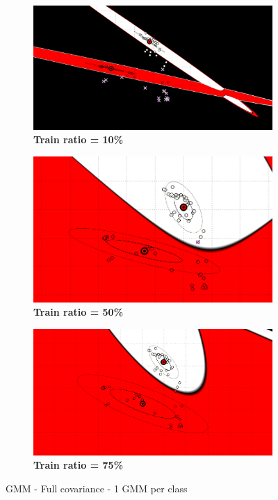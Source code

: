 \begin{figure} [ht]
\centering
	\begin{subfigure}[h]{0.32\textwidth}
    \centering
	\includegraphics[height=0.11\textheight]{./classification/full_var_gmm_1_10pourcent_test.png}
	\caption{\bf Train ratio = 10\%}
	\end{subfigure}
    \begin{subfigure}[h]{0.32\textwidth}
    \centering
    \includegraphics[height=0.11\textheight]{./classification/full_var_gmm_1_50pourcent_test.png}
	\caption{\bf Train ratio = 50\%}
    \end{subfigure}
    \begin{subfigure}[h]{0.32\textwidth}
    \centering
    \includegraphics[height=0.11\textheight]{./classification/full_var_gmm_1_75pourcent_test.png}
	\caption{\bf Train ratio = 75\%}
    \end{subfigure}

\caption{GMM - Full covariance - 1 GMM per class}
\label{fig:train_ratio}
\end{figure}

